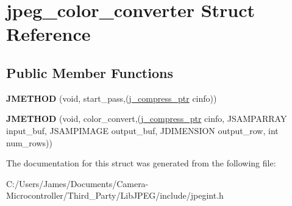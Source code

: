 \hypertarget{structjpeg__color__converter}{}\section{jpeg\+\_\+color\+\_\+converter Struct Reference}
\label{structjpeg__color__converter}
\subsection*{Public Member Functions}
\begin{DoxyCompactItemize}
\item 
\mbox{\label{structjpeg__color__converter_a3176e0fbee668d7d69c6574d1b14880c}} 
{\bfseries J\+M\+E\+T\+H\+OD} (void, start\+\_\+pass,(\hyperlink{structjpeg__compress__struct}{j\+\_\+compress\+\_\+ptr} cinfo))
\item 
\mbox{\label{structjpeg__color__converter_adf828600d2ec22bcf48f2d55986d2291}} 
{\bfseries J\+M\+E\+T\+H\+OD} (void, color\+\_\+convert,(\hyperlink{structjpeg__compress__struct}{j\+\_\+compress\+\_\+ptr} cinfo, J\+S\+A\+M\+P\+A\+R\+R\+AY input\+\_\+buf, J\+S\+A\+M\+P\+I\+M\+A\+GE output\+\_\+buf, J\+D\+I\+M\+E\+N\+S\+I\+ON output\+\_\+row, int num\+\_\+rows))
\end{DoxyCompactItemize}


The documentation for this struct was generated from the following file\+:\begin{DoxyCompactItemize}
\item 
C\+:/\+Users/\+James/\+Documents/\+Camera-\/\+Microcontroller/\+Third\+\_\+\+Party/\+Lib\+J\+P\+E\+G/include/jpegint.\+h\end{DoxyCompactItemize}

